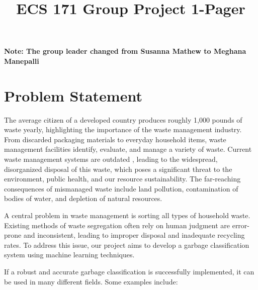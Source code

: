 \documentclass[conference]{IEEEtran}
\begin{document}
\title{\Huge ECS 171 Group Project 1-Pager}

\author{
  \centering
}

\maketitle

\large \textbf{Note: The group leader changed from Susanna Mathew to Meghana Manepalli}

\section{Problem Statement}

The average citizen of a developed country produces roughly 1,000 pounds of waste yearly, highlighting the importance of the waste management industry. From discarded packaging materials to everyday household items, waste management facilities identify, evaluate, and manage a variety of waste. Current waste management systems are outdated \cite{b1}, leading to the widespread, disorganized disposal of this waste, which poses a significant threat to the environment, public health, and our resource sustainability. The far-reaching consequences of mismanaged waste include land pollution, contamination of bodies of water, and depletion of natural resources.

A central problem in waste management is sorting all types of household waste. Existing methods of waste segregation often rely on human judgment are error-prone and inconsistent, leading to improper disposal and inadequate recycling rates. To address this issue, our project aims to develop a garbage classification system using machine learning techniques. 

If a robust and accurate garbage classification is successfully implemented, it can be used in many different fields. Some examples include:
\end{document}
